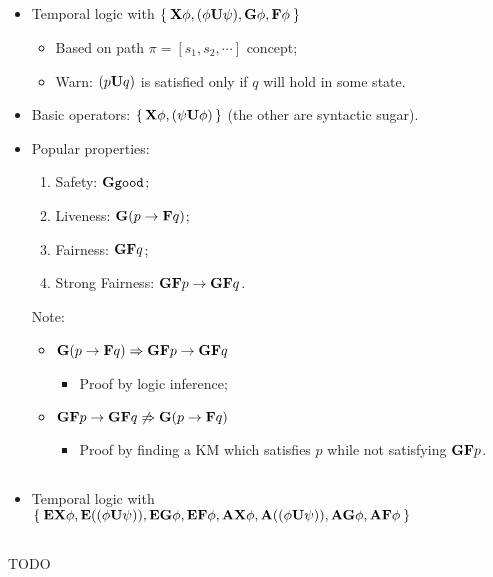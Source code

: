 \subsection{\LTL}

    \begin{itemize}

    \item   Temporal logic with
            $\Set{ \X{\phi}, \U{\phi}{\psi}, \G{\phi}, \F{\phi} }$

        \begin{itemize}
        \item   Based on path $\pi = [s_1, s_2, \cdots ]$ concept;
        \item   Warn: $\U{p}{q}$ is satisfied only if $q$ will hold in
                some state.
        \end{itemize}

    \item   Basic operators: $\set{ \X{\phi}, \U{\psi}{\phi} }$ (the other
            are syntactic sugar).

    \item   Popular properties:

        \begin{enumerate}
        \item   Safety: $\G{\Good}$;
        \item   Liveness: $\G{(p \imply \F{q})}$;
        \item   Fairness: $\G{\F{q}}$;
        \item   Strong Fairness: $\G{\F{p}} \imply \G{\F{q}}$.
        \end{enumerate}

        Note:
        \begin{itemize}
        \item   $\G{(p \imply \F{q})} \Imply \G{\F{p}} \imply \G{\F{q}}$
            \begin{itemize}
            \item   Proof by logic inference;
            \end{itemize}
        \item   $\G{\F{p}} \imply \G{\F{q}} \not\Imply
                 \G{(p \imply \F{q})}$
            \begin{itemize}
                \item   Proof by finding a KM which satisfies $p$ while not
                        satisfying $\G{\F{p}}$.
            \end{itemize}
        \end{itemize}

    \end{itemize}

\subsection{\CTL}

    \begin{itemize}

    \item   Temporal logic with
            $\Set{ \EX{\phi}, \EU{\phi}{\psi}, \EG{\phi}, \EF{\phi},
                   \AX{\phi}, \AU{\phi}{\psi}, \AG{\phi}, \AF{\phi} }$

    \end{itemize}

\subsection{\CTLs}

    TODO
